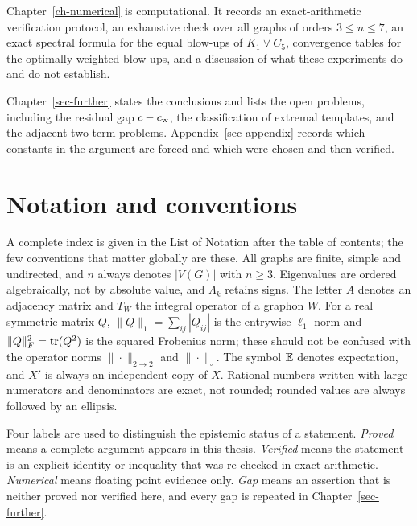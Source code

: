 Chapter~\ref{ch-numerical} is computational. It records an exact-arithmetic
verification protocol, an exhaustive check over all graphs of orders
$3\le n\le7$, an exact spectral formula for the equal blow-ups of
$K_1\vee C_5$, convergence tables for the optimally weighted blow-ups, and a
discussion of what these experiments do and do not establish.

Chapter~\ref{sec-further} states the conclusions and lists the open problems,
including the residual gap $c-c_{\mathrm{w}}$, the classification of extremal
templates, and the adjacent two-term problems. Appendix~\ref{sec-appendix}
records which constants in the argument are forced and which were chosen and
then verified.

\section{Notation and conventions}\label{sec-notation}
A complete index is given in the List of Notation after the table of
contents; the few conventions that matter globally are these. All graphs are
finite, simple and undirected, and $n$ always denotes $|V(G)|$ with $n\ge3$.
Eigenvalues are ordered algebraically, not by absolute value, and
$\Lambda_k$ retains signs. The letter $A$ denotes an adjacency matrix and
$T_W$ the integral operator of a graphon $W$. For a real symmetric matrix
$Q$, $\|Q\|_1=\sum_{ij}|Q_{ij}|$ is the entrywise $\ell_1$ norm and
$\|Q\|_F^2=\operatorname{tr}(Q^2)$ is the squared Frobenius norm; these should not be
confused with the operator norms $\|\cdot\|_{2\to2}$ and $\|\cdot\|_\square$.
The symbol $\mathbb E$ denotes expectation, and $X'$ is always an independent copy
of $X$. Rational numbers written with large numerators and denominators are
exact, not rounded; rounded values are always followed by an ellipsis.

Four labels are used to distinguish the epistemic status of a statement.
\emph{Proved} means a complete argument appears in this thesis.
\emph{Verified} means the statement is an explicit identity or inequality
that was re-checked in exact arithmetic. \emph{Numerical} means floating
point evidence only. \emph{Gap} means an assertion that is neither proved nor
verified here, and every gap is repeated in Chapter~\ref{sec-further}.
